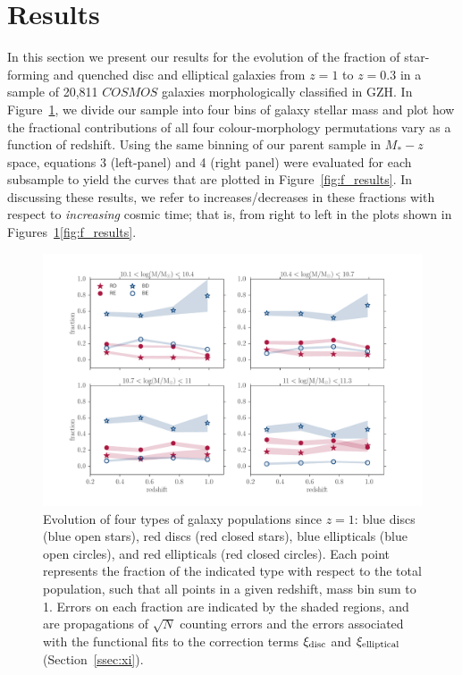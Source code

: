 \documentclass[useAMS,usenatbib]{mn2e}
\begin{document}
\section{Results}
\label{sec:results}
In this section we present our results for the evolution of the fraction of star-forming and quenched disc and elliptical galaxies from $z=1$ to $z=0.3$ in a sample of 20,811 $COSMOS$ galaxies morphologically classified in GZH. In Figure~\ref{fig:all_plot}, we divide our sample into four bins of galaxy stellar mass and plot how the fractional contributions of all four colour-morphology permutations vary as a function of redshift.  Using the same binning of our parent sample in $M_*-z$ space, equations 3 (left-panel) and 4 (right panel) were evaluated for each subsample to yield the curves that are plotted in Figure~\ref{fig:f_results}. In discussing these results, we refer to increases/decreases in these fractions with respect to \emph{increasing} cosmic time; that is, from right to left in the plots shown in Figures~\ref{fig:all_plot}\ref{fig:f_results}.

\begin{figure}
\centering
\includegraphics[width=\textwidth,trim={0cm 0cm 2cm 1cm},clip]{figures/morphologies_evolved.pdf}
\caption{Evolution of four types of galaxy populations since $z=1$: blue discs (blue open stars), red discs (red closed stars), blue ellipticals (blue open circles), and red ellipticals (red closed circles). Each point represents the fraction of the indicated type with respect to the total population, such that all points in a given redshift, mass bin sum to 1. Errors on each fraction are indicated by the shaded regions, and are propagations of $\sqrt{N}$ counting errors and the errors associated with the functional fits to the correction terms $\xi_{\rm disc}$ and $\xi_{\rm elliptical}$ (Section~\ref{ssec:xi}). }
\label{fig:all_plot}
\end{figure}
\end{document}
